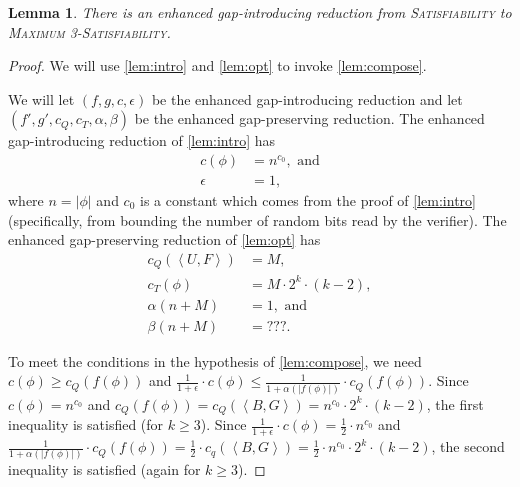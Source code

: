 \documentclass[]{article}
\theoremstyle{plain}
\newtheorem{lemma}{Lemma}
\theoremstyle{definition}
\newcommand{\pair}[2]{{\left\langle{#1}, {#2}\right\rangle}}
\begin{document}
\begin{lemma}\label{lem:gap3}
  There is an enhanced gap-introducing reduction from \textsc{Satisfiability} to \textsc{Maximum 3-Satisfiability}.
\end{lemma}
\begin{proof}
  We will use \autoref{lem:intro} and \autoref{lem:opt} to invoke \autoref{lem:compose}.

  We will let $(f, g, c, \epsilon)$ be the enhanced gap-introducing reduction and let $(f', g', c_Q, c_T, \alpha, \beta)$ be the enhanced gap-preserving reduction.
  The enhanced gap-introducing reduction of \autoref{lem:intro} has
  \begin{align*}
    c(\phi) & = n^{c_0}, \text{ and} \\
    \epsilon & = 1,
  \end{align*}
  where $n = |\phi|$ and $c_0$ is a constant which comes from the proof of \autoref{lem:intro} (specifically, from bounding the number of random bits read by the verifier).
  The enhanced gap-preserving reduction of \autoref{lem:opt} has
  \begin{align*}
    c_Q(\pair{U}{F}) & = M, \\
    c_T(\phi) & = M \cdot 2^k \cdot (k - 2), \\
    \alpha(n + M) & = 1, \text{ and} \\
    \beta(n + M) & = ???.
  \end{align*}

  To meet the conditions in the hypothesis of \autoref{lem:compose}, we need $c(\phi) \geq c_Q(f(\phi))$ and $\frac{1}{1 + \epsilon} \cdot c(\phi) \leq \frac{1}{1 + \alpha(|f(\phi)|)} \cdot c_Q(f(\phi))$.
  Since $c(\phi) = n^{c_0}$ and $c_Q(f(\phi)) = c_Q(\pair{B}{G}) = n^{c_0} \cdot 2^k \cdot (k - 2)$, the first inequality is satisfied (for $k \geq 3$).
  Since $\frac{1}{1 + \epsilon} \cdot c(\phi) = \frac{1}{2} \cdot n^{c_0}$ and $\frac{1}{1 + \alpha(|f(\phi)|)} \cdot c_Q(f(\phi)) = \frac{1}{2} \cdot c_q(\pair{B}{G}) = \frac{1}{2} \cdot n^{c_0} \cdot 2^k \cdot (k - 2)$, the second inequality is satisfied (again for $k \geq 3$).


\end{proof}
\end{document}
